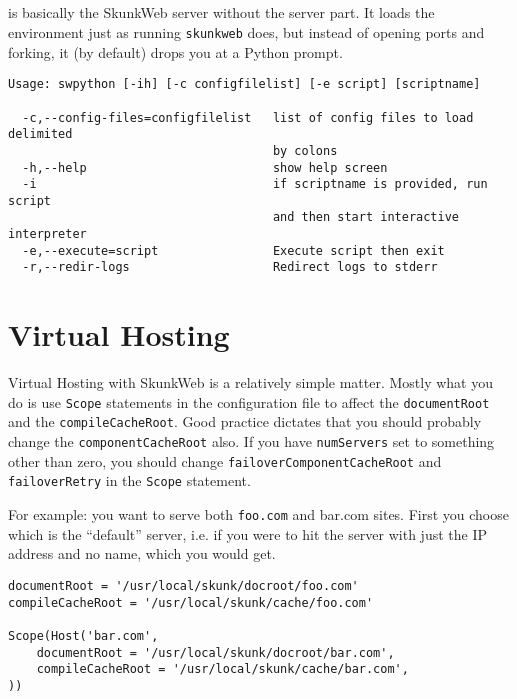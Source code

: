 \documentclass[titlepage]{manual}
\begin{document}
\section{\swpython}
\label{swpython}
\index{\swpython}
\swpython is basically the SkunkWeb server without the server part.  It
loads the environment just as running \texttt{skunkweb} does, but instead
of opening ports and forking, it (by default) drops you at a Python prompt.

\begin{verbatim}
Usage: swpython [-ih] [-c configfilelist] [-e script] [scriptname]

  -c,--config-files=configfilelist   list of config files to load delimited
                                     by colons
  -h,--help                          show help screen
  -i                                 if scriptname is provided, run script
                                     and then start interactive interpreter
  -e,--execute=script                Execute script then exit
  -r,--redir-logs                    Redirect logs to stderr
\end{verbatim}


\chapter{Virtual Hosting}
Virtual Hosting with SkunkWeb is a relatively simple matter.  Mostly
what you do is use \texttt{Scope} statements in the configuration file
to affect the \texttt{documentRoot} and the \texttt{compileCacheRoot}.
Good practice dictates that you should probably change the
\texttt{componentCacheRoot} also.  If you have \texttt{numServers} set
to something other than zero, you should change
\texttt{failoverComponentCacheRoot} and \texttt{failoverRetry} in the
\texttt{Scope} statement.

For example:  you want to serve both \texttt{foo.com} and {bar.com} sites.
First you choose which is the ``default'' server, i.e. if you were to hit
the server with just the IP address and no name, which you would get.

\begin{verbatim}
documentRoot = '/usr/local/skunk/docroot/foo.com'
compileCacheRoot = '/usr/local/skunk/cache/foo.com'

Scope(Host('bar.com',
    documentRoot = '/usr/local/skunk/docroot/bar.com',
    compileCacheRoot = '/usr/local/skunk/cache/bar.com',
))    
\end{verbatim}
\end{document}
